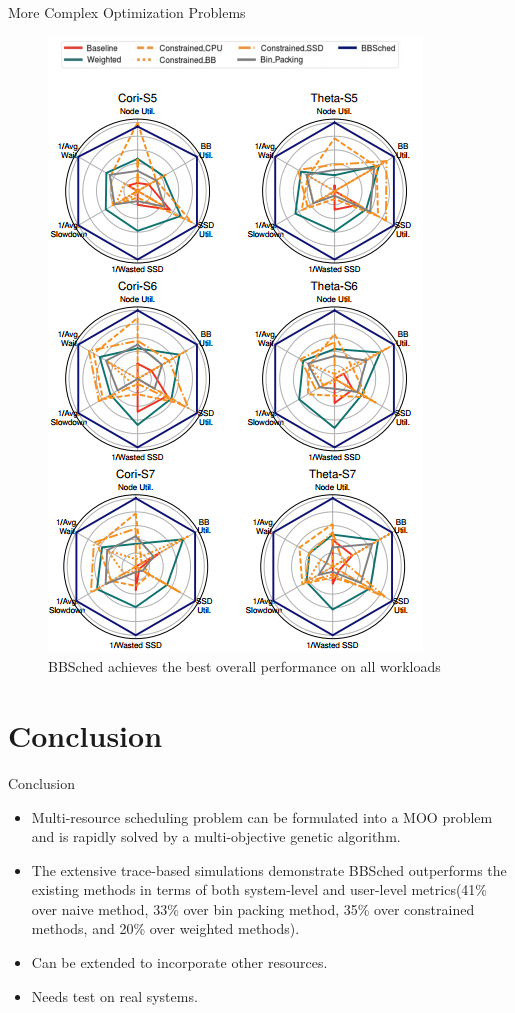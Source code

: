 \documentclass[aspectratio=1610]{beamer}
\begin{document}
\begin{frame}{More Complex Optimization Problems}
    \begin{figure}
        \centering
        \includegraphics[scale=0.3]{pic/more_concern.png}
        \caption{BBSched achieves the best overall performance on all workloads}
    \end{figure}
\end{frame}

\section{Conclusion}

\begin{frame}{Conclusion}
    \begin{itemize}
        \item Multi-resource scheduling problem can be formulated into a MOO problem and is rapidly solved by a multi-objective genetic algorithm.
        \item  The extensive trace-based simulations demonstrate BBSched outperforms the existing methods in terms of both system-level and user-level metrics(41\% over naive method, 33\% over bin packing method, 35\% over constrained methods, and 20\% over weighted methods). 
        \item  Can be extended to incorporate other resources.
        \item Needs test on real systems.
    \end{itemize}
\end{frame}
\end{document}
